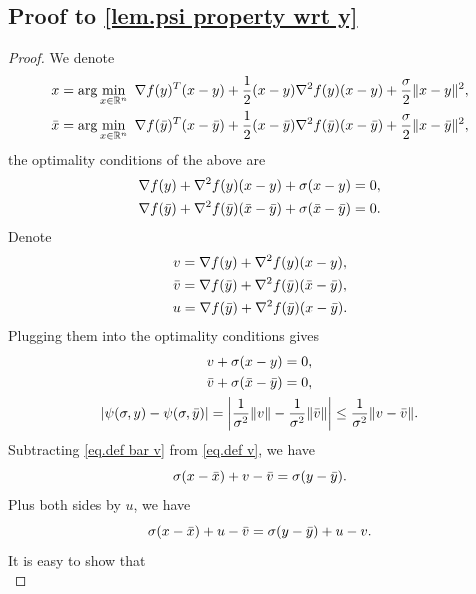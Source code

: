 \documentclass{article}
\begin{document}
\subsection*{Proof to \autoref{lem.psi property wrt y}}
\begin{proof}
    We denote 
    \begin{gather*}
        x = \arg\min_{x\in \mathbb{R}^n} \ \nabla f(y)^T(x-y) +\frac{1}{2}(x-y)\nabla ^2 f(y)(x-y) +\frac{\sigma}{2}\|x-y\|^2,\\
        \Bar{x} = \arg\min_{x\in \mathbb{R}^n} \ \nabla f(\Bar{y})^T(x-\Bar{y}) +\frac{1}{2}(x-\Bar{y})\nabla ^2 f(\Bar{y})(x-\Bar{y}) +\frac{\sigma}{2}\|x-\Bar{y}\|^2,
    \end{gather*}
    the optimality conditions of the above are 
    \begin{gather*}
        \nabla f(y) + \nabla ^2 f(y)(x-y) +\sigma(x-y)=0,\\
        \nabla f(\Bar{y})+\nabla ^2 f(\Bar{y})(\Bar{x}-\Bar{y})+\sigma(\Bar{x}-\Bar{y})=0.
    \end{gather*}
    Denote 
    \begin{gather*}
        v = \nabla f(y) + \nabla ^2 f(y)(x-y),\\
        \Bar{v} =  \nabla f(\Bar{y})+\nabla ^2 f(\Bar{y})(\Bar{x}-\Bar{y}),\\
        u = \nabla f(\Bar{y})+\nabla ^2 f(\Bar{y})(x-\Bar{y}).
    \end{gather*}
    Plugging them into the optimality conditions gives
    \begin{gather}
    \label{eq.def v}
        v+\sigma(x-y)=0,\\
    \label{eq.def bar v}
        \Bar{v}+\sigma(\Bar{x}-\Bar{y})=0,\\
    \label{eq.target distance initial}
        \left \vert \psi(\sigma,y)-\psi(\sigma,\Bar{y}) \right\vert= \left \vert\frac{1}{\sigma^2}\|v\| -\frac{1}{\sigma^2}\|\Bar{v}\|\right\vert\leq \frac{1}{\sigma^2}\|v-\Bar{v}\|.
    \end{gather}
    Subtracting \eqref{eq.def bar v} from \eqref{eq.def v}, we have
    \begin{equation*}
        \sigma(x-\Bar{x})+v -\Bar{v} = \sigma(y-\Bar{y}).
    \end{equation*}
    Plus both sides by $u$, we have
    \begin{equation*}
        \sigma(x-\Bar{x})+u-\Bar{v} = \sigma(y-\Bar{y})+u-v.
    \end{equation*}
    It is easy to show that
    \begin{equation*}

\end{equation*}
\end{proof}
\end{document}

